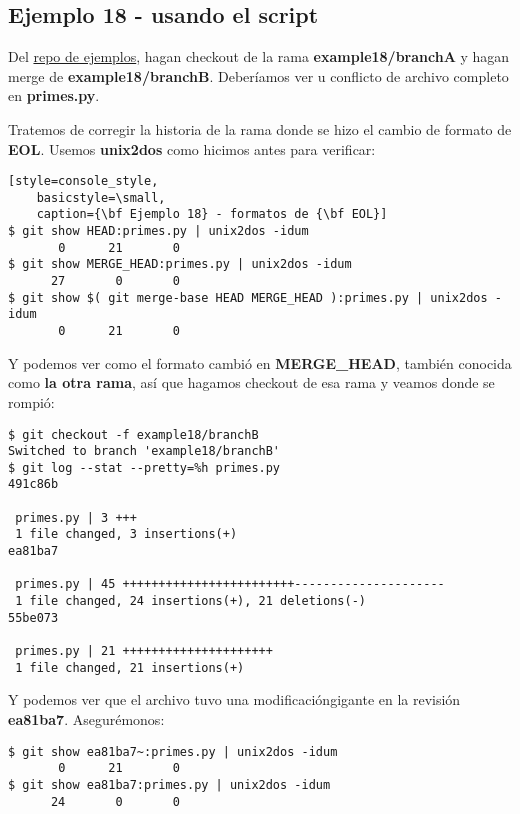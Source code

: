 \subsection{Ejemplo 18 - usando el script}
\label{example18}

Del \hyperref[examples_repo]{repo de ejemplos}, hagan checkout de la rama {\bf example18/branchA} y hagan merge de {\bf example18/branchB}.
Deberíamos ver u conflicto de archivo completo en {\bf primes.py}.

Tratemos de corregir la historia de la rama donde se hizo el cambio de formato de {\bf EOL}. Usemos {\bf unix2dos} como hicimos antes
para verificar:

\begin{lstlisting}[style=console_style,
	basicstyle=\small,
	caption={\bf Ejemplo 18} - formatos de {\bf EOL}]
$ git show HEAD:primes.py | unix2dos -idum
       0      21       0
$ git show MERGE_HEAD:primes.py | unix2dos -idum
      27       0       0
$ git show $( git merge-base HEAD MERGE_HEAD ):primes.py | unix2dos -idum
       0      21       0
\end{lstlisting}

Y podemos ver como el formato cambió en {\bf MERGE\_HEAD}, también conocida como  {\bf la otra rama}, así que hagamos checkout
de esa rama y veamos donde se rompió:

\begin{lstlisting}[style=console_style,
	basicstyle=\small,
	caption={\bf Ejemplo 18} - averiguando donde se rompió]
$ git checkout -f example18/branchB
Switched to branch 'example18/branchB'
$ git log --stat --pretty=%h primes.py
491c86b

 primes.py | 3 +++
 1 file changed, 3 insertions(+)
ea81ba7

 primes.py | 45 ++++++++++++++++++++++++---------------------
 1 file changed, 24 insertions(+), 21 deletions(-)
55be073

 primes.py | 21 +++++++++++++++++++++
 1 file changed, 21 insertions(+)
\end{lstlisting}

Y podemos ver que el archivo tuvo una modificacióngigante en la revisión {\bf ea81ba7}. Asegurémonos:

\begin{lstlisting}[style=console_style,
	basicstyle=\small,
	caption={\bf Ejemplo 18} - asegurándonos]
$ git show ea81ba7~:primes.py | unix2dos -idum
       0      21       0
$ git show ea81ba7:primes.py | unix2dos -idum
      24       0       0
\end{lstlisting}

